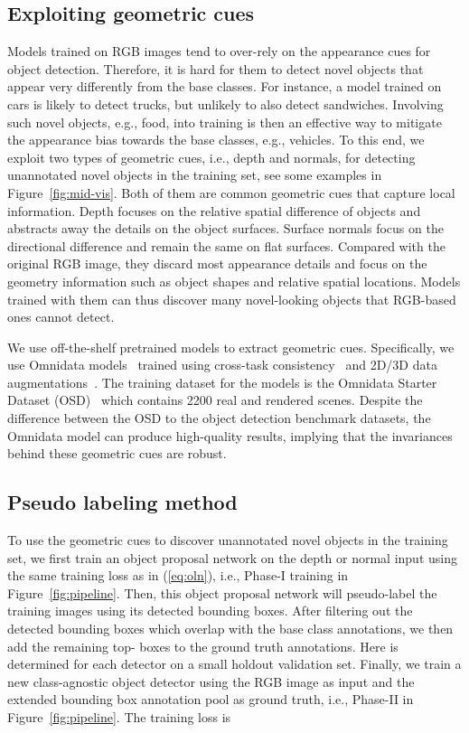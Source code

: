 \documentclass{article} \usepackage{iclr2023_conference,times}
\begin{document}
\subsection{Exploiting geometric cues}
Models trained on RGB images tend to over-rely on the appearance cues for object detection. Therefore, it is hard for them to detect novel objects that appear very differently from the base classes. For instance, a model trained on cars is likely to detect trucks, but unlikely to also detect sandwiches. Involving such novel objects, e.g., food, into training is then an effective way to mitigate the appearance bias towards the base classes, e.g., vehicles. To this end, we exploit two types of geometric cues, i.e., depth and normals, for detecting unannotated novel objects in the training set, see some examples in Figure~\ref{fig:mid-vis}. Both of them are common geometric cues that capture local information. Depth focuses on the relative spatial difference of objects and abstracts away the details on the object surfaces. Surface normals focus on the directional difference and remain the same on flat surfaces. Compared with the original RGB image, they discard most appearance details and focus on the geometry information such as object shapes and relative spatial locations. Models trained with them can thus discover many novel-looking objects that RGB-based ones cannot detect.


We use off-the-shelf pretrained models to extract geometric cues. Specifically, we use Omnidata models~\citep{eftekhar2021omnidata} trained using cross-task consistency~\citep{zamir2020robust} and 2D/3D data augmentations~\citep{kar20223d}.
The training dataset for the models is the Omnidata Starter Dataset (OSD)~\citep{eftekhar2021omnidata} which contains 2200 real and rendered scenes. 
Despite the difference between the OSD to the object detection benchmark datasets, the Omnidata model can produce high-quality results, implying that the invariances behind these geometric cues are robust. 



\subsection{Pseudo labeling method}\label{sec:pipeline}
To use the geometric cues to discover unannotated novel objects in the training set, we first train an object proposal network on the depth or normal input using the same training loss as in (\ref{eq:oln}), i.e., Phase-I training in Figure~\ref{fig:pipeline}. 
Then, this object proposal network will pseudo-label the training images using its detected bounding boxes. 
After filtering out the detected bounding boxes which overlap with the base class annotations, we then add the remaining top- boxes to the ground truth annotations. 
Here  is determined for each detector on a small holdout validation set. Finally, we train a new class-agnostic object detector using the RGB image as input and the extended bounding box annotation pool as ground truth, i.e., Phase-II in Figure~\ref{fig:pipeline}. The training loss is
\end{document}
